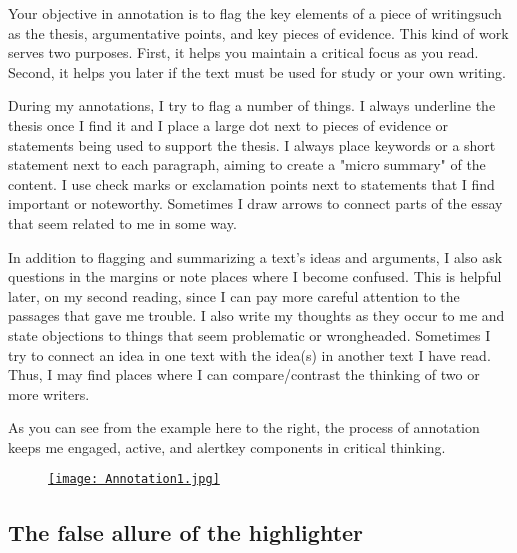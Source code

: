 Your objective in annotation is to flag the key elements of a piece of
writing\textemdash such as the thesis, argumentative points, and key pieces of
evidence. This kind of work serves two purposes. First, it helps you maintain a
critical focus as you read. Second, it helps you later if the text must be used for study or your own writing.

During my annotations, I try to flag a number of
things. I always underline the thesis once I find it and I place a large dot
next to pieces of evidence or statements being used to support the
thesis. I always place keywords or a short statement next to each paragraph,
aiming to create a "micro summary" of the content. I use check marks or
exclamation points next to statements that I find important or noteworthy.
Sometimes I draw arrows to connect parts of the essay that seem related to me in
some way.

In addition to flagging and summarizing a text's ideas and arguments, I also ask
questions in the margins or note places where I become confused. This is helpful
later, on my second reading, since I can pay more careful attention to the
passages that gave me trouble. I also write my thoughts as they occur to me and
state objections to things that seem problematic or wrongheaded. Sometimes I try
to connect an idea in one text with the idea(s) in another text I have read.
Thus, I may find places where I can compare/contrast the thinking of two or more
writers.

As you can see from the example here to the right, the process of annotation
keeps me engaged, active, and alert\textemdash key components in critical
thinking.

\begin{center} 
\begin{figure}
\href{https://github.com/stockphrase/OpenHandbook/blob/master/Chapters/images/Annotation1.jpg?raw=true}{\texttt{[image: Annotation1.jpg]}}
\end{figure}



\end{center}



\subsection{The false allure of the highlighter}

